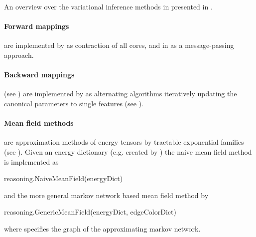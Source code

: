 An overview over the variational inference methods in presented in .

\paragraph{Forward mappings} are implemented by  as contraction of all cores, and in  as a message-passing approach.

\paragraph{Backward mappings} (see ) are implemented by  as alternating algorithms iteratively updating the canonical parameters to single features (see ).

\paragraph{Mean field methods} are approximation methods of energy tensors by tractable exponential families (see ).
Given an energy dictionary (e.g. created by ) the naive mean field method is implemented as
\begin{centeredcode}
    reasoning.NaiveMeanField(energyDict)
\end{centeredcode}
and the more general markov network based mean field method by
\begin{centeredcode}
    reasoning.GenericMeanField(energyDict, edgeColorDict)
\end{centeredcode}
where  specifies the graph of the approximating markov network.


